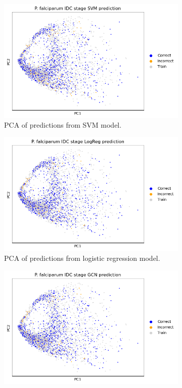 \documentclass{article}
\begin{document}
\begin{figure}[htbp]
  \centering
  
  \begin{subfigure}[b]{0.3\textwidth}
      \includegraphics[width=\textwidth]{figures/pca_Pf_prediction_SVM.png}
      \caption{PCA of predictions from SVM model.}
      \label{fig:sub1}
  \end{subfigure}
  \hfill
  \begin{subfigure}[b]{0.3\textwidth}
      \includegraphics[width=\textwidth]{figures/pca_Pf_prediction_LogReg.png}
      \caption{PCA of predictions from logistic regression model.}
      \label{fig:sub2}
  \end{subfigure}
  \hfill
  \begin{subfigure}[b]{0.3\textwidth}
      \includegraphics[width=\textwidth]{figures/pca_Pf_prediction_GCN.png}

\end{subfigure}
\end{figure}
\end{document}
